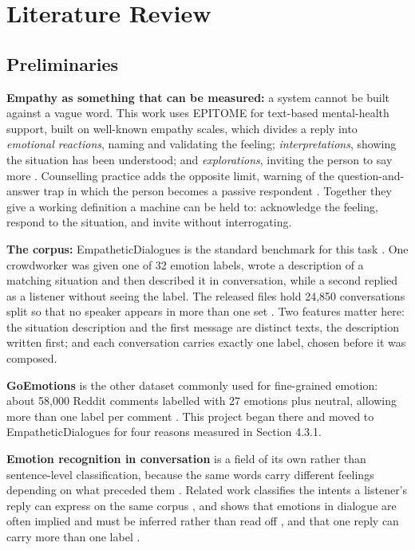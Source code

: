 \chapter{Literature Review}
\label{ch:2}

\section{Preliminaries}
\label{sec:2.1}

\textbf{Empathy as something that can be measured:} a system cannot be built against a vague word. This work uses EPITOME for text-based mental-health support, built on well-known empathy scales, which divides a reply into \textit{emotional reactions}, naming and validating the feeling; \textit{interpretations}, showing the situation has been understood; and \textit{explorations}, inviting the person to say more \cite{sharma2020epitome}. Counselling practice adds the opposite limit, warning of the question-and-answer trap in which the person becomes a passive respondent \cite{samhsa2019tip35}. Together they give a working definition a machine can be held to: acknowledge the feeling, respond to the situation, and invite without interrogating.

\textbf{The corpus:} EmpatheticDialogues is the standard benchmark for this task \cite{rashkin2019}. One crowdworker was given one of 32 emotion labels, wrote a description of a matching situation and then described it in conversation, while a second replied as a listener without seeing the label. The released files hold 24,850 conversations split so that no speaker appears in more than one set \cite{ed_github}. Two features matter here: the situation description and the first message are distinct texts, the description written first; and each conversation carries exactly one label, chosen before it was composed.

\textbf{GoEmotions }is the other dataset commonly used for fine-grained emotion: about 58,000 Reddit comments labelled with 27 emotions plus neutral, allowing more than one label per comment \cite{demszky2020}. This project began there and moved to EmpatheticDialogues for four reasons measured in Section 4.3.1.

\textbf{Emotion recognition in conversation} is a field of its own rather than sentence-level classification, because the same words carry different feelings depending on what preceded them \cite{poria2019erc}. Related work classifies the intents a listener's reply can express on the same corpus \cite{welivita2020}, and shows that emotions in dialogue are often implied and must be inferred rather than read off \cite{koga2023implicit}, and that one reply can carry more than one label \cite{belay2025}.

